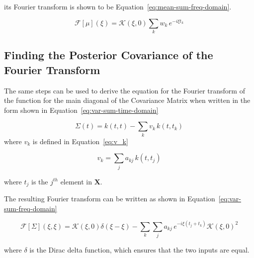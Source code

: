 \documentclass[12pt]{article}
\begin{document}
    \noindent its Fourier transform is shown to be Equation~\ref{eq:mean-sum-freq-domain}.

    \begin{equation}
        \mathcal{F}[{\mu}](\xi) = \mathcal{K}(\xi,0) \sum_k w_k \, e^{- i \xi t_k} \label{eq:mean-sum-freq-domain}
    \end{equation}

    \subsection{Finding the Posterior Covariance of the Fourier Transform}

    The same steps can be used to derive the equation for the Fourier transform of the function for the main diagonal of the Covariance Matrix when written in the form shown in Equation~\ref{eq:var-sum-time-domain}

    \begin{equation}
        \Sigma(t) = k(t,t) - \sum_k v_k \, k(t,t_k) \label{eq:var-sum-time-domain}
    \end{equation}
    \noindent where $v_k$ is defined in Equation~\ref{eq:v_k}

    \begin{equation}
        v_k = \sum_j a_{kj} \, k(t,t_j) \label{eq:v_k}
    \end{equation}

    \noindent where $t_j$ is the $j^{th}$ element in $\mathbf{X}$.

    The resulting Fourier transform can be written as shown in Equation~\ref{eq:var-sum-freq-domain}


    \begin{equation}
        \mathcal{F}[\Sigma](\xi, \xi) = \mathcal{K}(\xi,0) \delta(\xi - \xi)  - \sum_k \sum_j a_{kj} \, e^{-i \xi (t_j + t_k)} \mathcal{K}(\xi,0)^2 \label{eq:var-sum-freq-domain}
    \end{equation}

    \noindent where $\delta$ is the Dirac delta function, which ensures that the two inputs are equal.
\end{document}
